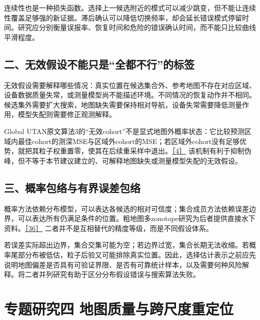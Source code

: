 连续性也是一种损失函数。选择上一候选附近的模式可以减少跳变，但不能让连续性覆盖足够强的新证据。滞后确认可以降低切换频率，却会延长错误模式停留时间。研究应分别衡量误报率、恢复时间和危险的错误确认时间，而不能只比较曲线平滑程度。

\hypertarget{ux4e8cux65e0ux6548ux5047ux8bbeux4e0dux80fdux53eaux662fux5168ux90fdux4e0dux884cux7684ux6807ux7b7e}{%
\subsection{二、无效假设不能只是``全都不行''的标签}\label{ux4e8cux65e0ux6548ux5047ux8bbeux4e0dux80fdux53eaux662fux5168ux90fdux4e0dux884cux7684ux6807ux7b7e}}

无效假设需要解释哪些情况：真实位置在候选集合外、参考地图不存在对应区域、设备数据质量失常，或测量模型尚不能描述环境。不同情况的恢复动作并不相同。候选集外需要扩大搜索，地图缺失需要保持相对导航，设备失常需要降低测量作用，模型失配则需要修正观测解释。

Global UTAN原文算法3的``无效cohort''不是显式地图外概率状态：它比较预测区域内最佳cohort的测深MSE与区域外cohort的MSE；若区域外cohort没有足够优势，就把其粒子权重置零，使其在后续重采样中退出。\href{https://doi.org/10.1109/TIM.2026.3716492}{［4］} 该机制有利于抑制伪峰，但不等于本节建议建立的、可解释地图缺失或测量模型失配的无效假设。

\hypertarget{ux4e09ux6982ux7387ux5305ux7edcux4e0eux6709ux754cux8befux5deeux5305ux7edc}{%
\subsection{三、概率包络与有界误差包络}\label{ux4e09ux6982ux7387ux5305ux7edcux4e0eux6709ux754cux8befux5deeux5305ux7edc}}

概率方法依赖分布模型，可以表达各候选的相对可信度；集合成员方法依赖误差边界，可以表达所有仍满足条件的位置。粗地图多zonotope研究为后者提供直接水下资料。\href{https://onlinelibrary.wiley.com/doi/abs/10.1002/rob.22407}{［36］} 二者并不是互相替代的精度等级，而是不同假设体系。

若误差实际超出边界，集合交集可能为空；若边界过宽，集合长期无法收缩。若概率尾部分布被低估，粒子后验又可能排除真实位置。因此，选择估计表示之前应先说明地图偏差是否具有可验证界限、是否有可靠统计样本，以及需要何种风险解释。将二者并列研究有助于区分分布假设错误与搜索算法失败。

\hypertarget{ux4e13ux9898ux7814ux7a76ux56db-ux5730ux56feux8d28ux91cfux4e0eux8de8ux5c3aux5ea6ux91cdux5b9aux4f4d}{%
\section{专题研究四 地图质量与跨尺度重定位}\label{ux4e13ux9898ux7814ux7a76ux56db-ux5730ux56feux8d28ux91cfux4e0eux8de8ux5c3aux5ea6ux91cdux5b9aux4f4d}}

